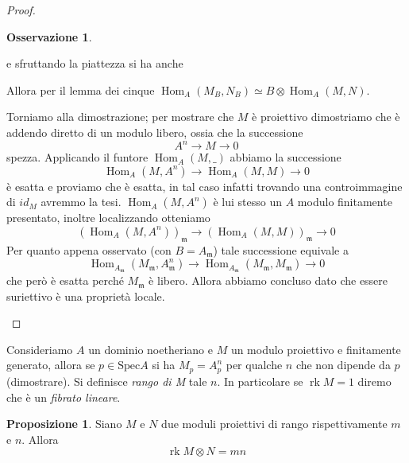\documentclass[a4paper,11pt,oneside]{book}
\newcommand{\Spec}{\mathrm{Spec}}
\newcommand{\m}{\mathfrak{m}}
\DeclareMathOperator{\Hom}{Hom}
\DeclareMathOperator{\rank}{rk}
\theoremstyle{definition}
\newtheorem{prop}{Proposizione}
\newtheorem{oss}[section]{Osservazione}
\begin{document}
\begin{proof}
\begin{itemize}
\begin{oss}
\begin{itemize}
 e sfruttando la piattezza si ha anche
  \begin{center}
		  \end{center}
      Allora per il lemma dei cinque $\Hom_A(M_B,N_B)\simeq B\otimes\Hom_A(M,N)$.
 \end{itemize}
 \end{oss}
 Torniamo alla dimostrazione; per mostrare che $M$ è proiettivo dimostriamo che 
  è addendo diretto di un
  modulo libero, ossia che la successione
  \[
    A^n\rightarrow M \rightarrow 0
  \]
  spezza. 
 Applicando il funtore $\Hom_A(M,\_)$ abbiamo la successione
  \[
   \Hom_A(M,A^n)\rightarrow \Hom_A(M,M ) \rightarrow 0
 \]
 è esatta e proviamo che è esatta, in tal caso infatti trovando una controimmagine di $id_M$ avremmo la tesi.
 $\Hom_A(M,A^n)$ è lui stesso un $A$ modulo finitamente presentato, inoltre localizzando otteniamo
  \[
   (\Hom_A(M,A^n))_{\m}\rightarrow (\Hom_A(M,M ) )_{\m}\rightarrow 0
 \]
 Per quanto appena osservato (con $B=A_\m$) tale successione equivale  a 
  \[
   \Hom_{A_{\m}}(M_{\m},A^n_{\m})\rightarrow \Hom_{A_{\m}}(M_{\m},M_{\m} ) \rightarrow 0
 \]
 che però è esatta perché $M_\m$ è libero. Allora abbiamo concluso dato che essere suriettivo è una proprietà locale.
 \end{itemize}
 \end{proof}
 
 Consideriamo $A$ un dominio noetheriano e $M$ un modulo proiettivo e finitamente generato, allora se $p\in\Spec A$ si ha
 $M_p=A_p^n$ per qualche $n$ che non dipende da $p$ (dimostrare). Si definisce \emph{rango di M} tale $n$. In particolare se
 $\rank M=1$ diremo che è un \emph{fibrato lineare}.
 
 \begin{prop}
  Siano $M$ e $N$ due moduli proiettivi di rango rispettivamente $m$ e $n$. Allora
  \[
   \rank M\otimes N=mn
  \]
 \end{prop}
\end{document}
